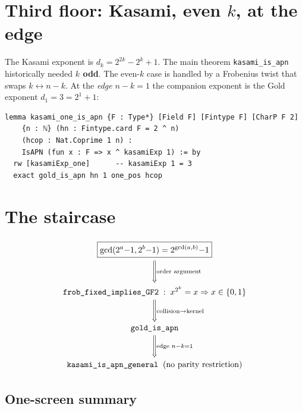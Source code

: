 \documentclass[11pt]{article}
\begin{document}
\bigskip

\section{Third floor: Kasami, even $k$, at the edge}

\noindent
The Kasami exponent is $d_k = 2^{2k}-2^k+1$. The main theorem
\texttt{kasami\_is\_apn} historically needed \textbf{$k$ odd}. The even-$k$ case
is handled by a Frobenius twist that swaps $k\leftrightarrow n-k$. At the
\emph{edge} $n-k=1$ the companion exponent is the Gold exponent $d_1=3=2^1+1$:

\begin{lstlisting}
lemma kasami_one_is_apn {F : Type*} [Field F] [Fintype F] [CharP F 2]
    {n : ℕ} (hn : Fintype.card F = 2 ^ n)
    (hcop : Nat.Coprime 1 n) :
    IsAPN (fun x : F => x ^ kasamiExp 1) := by
  rw [kasamiExp_one]      -- kasamiExp 1 = 3
  exact gold_is_apn hn 1 one_pos hcop
\end{lstlisting}


\bigskip

\section*{The staircase}

\[
\begin{tikzcd}[row sep=large, column sep=huge]
\boxed{\gcd(2^a{-}1,2^b{-}1)=2^{\gcd(a,b)}{-}1}
  \arrow[d, Rightarrow, "{\text{order argument}}"] \\
\texttt{frob\_fixed\_implies\_GF2}\;:\; x^{2^k}=x \Rightarrow x\in\{0,1\}
  \arrow[d, Rightarrow, "{\text{collision} \to \text{kernel}}"] \\
\texttt{gold\_is\_apn}
  \arrow[d, Rightarrow, "{\text{edge } n-k=1}"] \\
\texttt{kasami\_is\_apn\_general}\;\;(\text{no parity restriction})
\end{tikzcd}
\]

\bigskip
\subsection*{One-screen summary}
\end{document}
